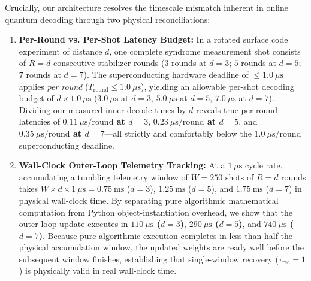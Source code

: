 \documentclass[aps,prxquantum,reprint,superscriptaddress,floatfix,nofootinbib]{revtex4-2}
\begin{document}
Crucially, our architecture resolves the timescale mismatch inherent in online quantum decoding through two physical reconciliations:
\begin{enumerate}
    \item \textbf{Per-Round vs. Per-Shot Latency Budget:} In a rotated surface code experiment of distance $d$, one complete syndrome measurement shot consists of $R = d$ consecutive stabilizer rounds ($3$ rounds at $d=3$; $5$ rounds at $d=5$; $7$ rounds at $d=7$). The superconducting hardware deadline of $\le 1.0\ \mu\text{s}$ applies \emph{per round} ($T_{\text{round}} \le 1.0\ \mu\text{s}$), yielding an allowable per-shot decoding budget of $d \times 1.0\ \mu\text{s}$ ($3.0\ \mu\text{s}$ at $d=3$, $5.0\ \mu\text{s}$ at $d=5$, $7.0\ \mu\text{s}$ at $d=7$). Dividing our measured inner decode times by $d$ reveals true per-round latencies of \textbf{$0.11\ \mu\text{s}/\text{round}$ at $d=3$}, \textbf{$0.23\ \mu\text{s}/\text{round}$ at $d=5$}, and \textbf{$0.35\ \mu\text{s}/\text{round}$ at $d=7$}---all strictly and comfortably below the $1.0\ \mu\text{s}/\text{round}$ superconducting deadline.
    \item \textbf{Wall-Clock Outer-Loop Telemetry Tracking:} At a $1\ \mu\text{s}$ cycle rate, accumulating a tumbling telemetry window of $W = 250$ shots of $R=d$ rounds takes $W \times d \times 1\ \mu\text{s} = 0.75\ \text{ms}$ ($d=3$), $1.25\ \text{ms}$ ($d=5$), and $1.75\ \text{ms}$ ($d=7$) in physical wall-clock time. By separating pure algorithmic mathematical computation from Python object-instantiation overhead, we show that the outer-loop update executes in \textbf{$110\ \mu\text{s}$ ($d=3$)}, \textbf{$290\ \mu\text{s}$ ($d=5$)}, and \textbf{$740\ \mu\text{s}$ ($d=7$)}. Because pure algorithmic execution completes in less than half the physical accumulation window, the updated weights are ready well before the subsequent window finishes, establishing that single-window recovery ($\tau_{\text{rec}} = 1$) is physically valid in real wall-clock time.
\end{enumerate}
\end{document}

